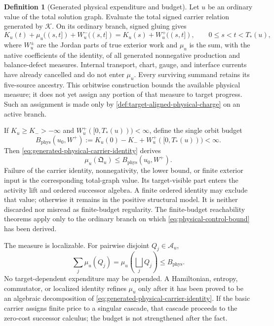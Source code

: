 \documentclass[11pt]{article}
\numberwithin{section}{part}
\theoremstyle{plain}
\theoremstyle{definition}
\newtheorem{definition}[definition]{Definition}
\theoremstyle{remark}
\newcommand{\Phys}{\mathrm{phys}}
\newcommand{\Budget}{B_{\Phys}}
\begin{document}
\begin{definition}[Generated physical expenditure and budget]
\label{def:physical-budget}
Let \(u\) be an ordinary value of the total solution graph.  Evaluate the
total signed carrier relation generated by \(\mathcal K\).  On its ordinary
branch, signed gluing gives
\begin{equation}
 \label{eq:generated-physical-carrier-identity}
 K_u(t)+\mu_u((s,t])+W_u^-((s,t])
 =K_u(s)+W_u^+((s,t]),
 \qquad 0\le s<t<T_*(u),
\end{equation}
where \(W_u^\pm\) are the Jordan parts of true exterior work and
\(\mu_u\) is the sum, with the native coefficients of the identity, of all
generated nonnegative production and balance-defect measures.  Internal
transport, chart, gauge, and interface currents have already cancelled and
do not enter \(\mu_u\).  Every surviving summand retains its five-source
ancestry.  This orbitwise construction bounds the available physical measure;
it does not yet assign any portion of that measure to target progress.  Such
an assignment is made only by
\cref{def:target-aligned-physical-charge} on an active branch.

If \(K_u\ge K_->-\infty\) and
\(W_u^+([0,T_*(u)))<\infty\), define the single orbit budget
\begin{equation}
 \label{eq:generated-physical-budget}
 \Budget(u_0,W^+)
 :=K_u(0)-K_-+W_u^+([0,T_*(u)))<\infty.
\end{equation}
Then \eqref{eq:generated-physical-carrier-identity} derives
\begin{equation}
 \label{eq:physical-control-bound}
 \mu_u(\mathfrak Q_u)\le \Budget(u_0,W^+).
\end{equation}
Failure of the carrier identity, nonnegativity, the lower bound, or finite
exterior input is the corresponding total-graph value.  Its target-visible
part enters the activity lift and ordered successor algebra.  A finite
ordered identity may exclude that value; otherwise it remains in the positive
structural model.  It is neither discarded nor misread as finite-budget
regularity.  The finite-budget reachability theorems apply only to the
ordinary branch on which \eqref{eq:physical-control-bound} has been derived.

The measure is localizable.  For pairwise disjoint
\(Q_j\in\mathcal A_u\),
\begin{equation}
 \label{eq:physical-countable-additivity}
 \sum_j\mu_u(Q_j)
 =\mu_u\!\left(\bigsqcup_jQ_j\right)
 \le \Budget.
\end{equation}
No target-dependent expenditure may be appended.  A Hamiltonian, entropy,
commutator, or localized identity refines \(\mu_u\) only after it has been
proved to be an algebraic decomposition of
\eqref{eq:generated-physical-carrier-identity}.  If the basic carrier assigns
finite price to a singular cascade, that cascade proceeds to the zero-cost
successor calculus; the budget is not strengthened after the fact.
\end{definition}
\end{document}
